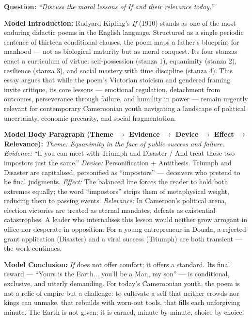 \documentclass[11pt]{article}
\begin{document}
\begin{exoresolu}
\textbf{Question:} \emph{``Discuss the moral lessons of If and their relevance today.''}

\medskip
\textbf{Model Introduction:}
Rudyard Kipling's \emph{If} (1910) stands as one of the most enduring didactic poems in the English language. Structured as a single periodic sentence of thirteen conditional clauses, the poem maps a father's blueprint for manhood — not as biological maturity but as moral conquest. Its four stanzas enact a curriculum of virtue: self-possession (stanza 1), equanimity (stanza 2), resilience (stanza 3), and social mastery with time discipline (stanza 4). This essay argues that while the poem's Victorian stoicism and gendered framing invite critique, its core lessons — emotional regulation, detachment from outcomes, perseverance through failure, and humility in power — remain urgently relevant for contemporary Cameroonian youth navigating a landscape of political uncertainty, economic precarity, and social fragmentation.

\medskip
\textbf{Model Body Paragraph (Theme $\rightarrow$ Evidence $\rightarrow$ Device $\rightarrow$ Effect $\rightarrow$ Relevance):}
\textit{Theme: Equanimity in the face of public success and failure.}
\textit{Evidence:} ``If you can meet with Triumph and Disaster / And treat those two impostors just the same.''
\textit{Device:} Personification + Antithesis. Triumph and Disaster are capitalised, personified as ``impostors'' — deceivers who pretend to be final judgments.
\textit{Effect:} The balanced line forces the reader to hold both extremes equally; the word ``impostors'' strips them of metaphysical weight, reducing them to passing events.
\textit{Relevance:} In Cameroon's political arena, election victories are treated as eternal mandates, defeats as existential catastrophes. A leader who internalises this lesson would neither grow arrogant in office nor desperate in opposition. For a young entrepreneur in Douala, a rejected grant application (Disaster) and a viral success (Triumph) are both transient — the work continues.

\medskip
\textbf{Model Conclusion:}
\emph{If} does not offer comfort; it offers a standard. Its final reward — ``Yours is the Earth... you'll be a Man, my son'' — is conditional, exclusive, and utterly demanding. For today's Cameroonian youth, the poem is not a relic of empire but a challenge: to cultivate a self that neither crowds nor kings can unmake, that rebuilds with worn-out tools, that fills each unforgiving minute. The Earth is not given; it is earned, minute by minute, choice by choice.
\end{exoresolu}
\end{document}

